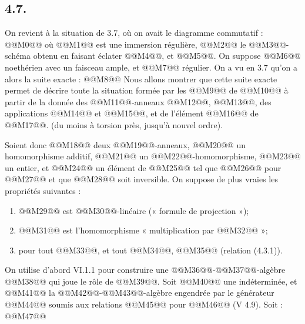 
\subsection*{4.7.}

On
revient à la situation de 3.7, où on avait le diagramme commutatif :
@@M0@@
où @@M1@@ est une immersion régulière, @@M2@@ le @@M3@@-schéma obtenu en faisant éclater @@M4@@, et @@M5@@. On suppose @@M6@@ noethérien avec un faisceau ample, et @@M7@@ régulier. On a vu en 3.7 qu'on a alors la suite exacte :
@@M8@@
Nous allons montrer que cette suite exacte permet de décrire toute la situation formée par les @@M9@@ de @@M10@@ à partir de la donnée des @@M11@@-anneaux @@M12@@, @@M13@@, des applications @@M14@@ et @@M15@@, et de l'élément @@M16@@ de @@M17@@. (du moins à torsion près, jusqu'à nouvel ordre).

Soient donc @@M18@@ deux @@M19@@-anneaux, @@M20@@ un homomorphisme additif, @@M21@@ un @@M22@@-homomorphisme, @@M23@@ un entier, et @@M24@@ un élément de @@M25@@ tel que @@M26@@ pour @@M27@@ et que @@M28@@ soit inversible. On suppose de plus vraies les propriétés suivantes :
\begin{enumerate}[label=\roman*)]
\item @@M29@@ est @@M30@@-linéaire (« formule de projection »);
\item @@M31@@ est l'homomorphisme « multiplication par @@M32@@ »;
\item pour tout @@M33@@, et tout @@M34@@, @@M35@@ (relation (4.3.1)).
\end{enumerate}

On utilise d'abord VI.1.1 pour construire une @@M36@@-@@M37@@-algèbre @@M38@@ qui joue le rôle de @@M39@@. Soit @@M40@@ une indéterminée, et @@M41@@ la @@M42@@-@@M43@@-algèbre engendrée par le générateur @@M44@@ soumis aux relations @@M45@@ pour @@M46@@ (V 4.9). Soit :
@@M47@@

